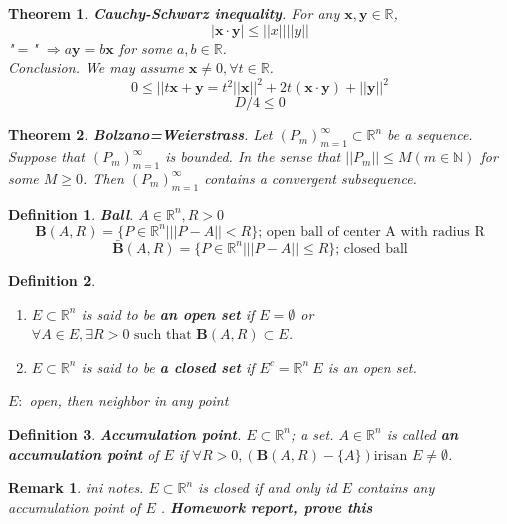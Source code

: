 \documentclass[a4paper,10pt]{article}
\newtheorem{remark}{Remark}[]
\newtheorem{theo}{Theorem}[]
\newtheorem{defi}{Definition}[]
\begin{document}
\begin{theo}
	\textbf{Cauchy-Schwarz inequality}. For any $ \mathbf{x}, \mathbf{y} \in \mathbb{R} $,
	\[ |\mathbf{x} \cdot \mathbf{y}| \leq ||x|| ||y||\]
	"$ = $" $ \Rightarrow  a\mathbf{y} = b\mathbf{x}$ for some $ a,b \in \mathbb{R} $.\\
	Conclusion. We may assume $ \mathbf{x} \neq 0 , \forall t \in \mathbb{R} $.
	\[ 0 \leq ||t\mathbf{x}+\mathbf{y} = t^2||\mathbf{x}||^2+2t(\mathbf{x}\cdot\mathbf{y})+||\mathbf{y}||^2 \]
	\[D/4 \leq 0\]
\end{theo}

\begin{theo}
	\textbf{Bolzano=Weierstrass}. Let $ (P_{m})_{m=1}^{\infty} \subset \mathbb{R}^n $ be a sequence. Suppose that $ (P_{m})_{m=1}^{\infty} $ is bounded. In the sense that $ ||P_{m}|| \leq M (m \in \mathbb{N}) $ for some $ M \geq 0 $. Then $ (P_{m})_{m=1}^{\infty} $ contains a convergent subsequence.
\end{theo}

\begin{defi}
	\textbf{Ball}. $ A \in \mathbb{R}^n, R>0 $
	\[ \mathbf{B}(A,R) = \{ P \in \mathbb{R}^n | ||P-A||<R \} \text{; open ball of center A with radius R} \]
	\[ \bar{\mathbf{B}}(A,R) = \{ P \in \mathbb{R}^n | ||P-A||\leq R \} \text{; closed ball} \]
\end{defi}

\begin{defi}
	\begin{enumerate}
		\item $ E \subset \mathbb{R}^n $ is said to be \textbf{an open set} if $ E = \emptyset $ or $ \forall A \in E , \exists R>0 \text{ such that } \mathbf{B}(A,R) \subset E $.
		\item $ E \subset \mathbb{R}^n $ is said to be \textbf{a closed set} if $ E^{c} = \mathbb{R}^n \ E $ is an open set.
	\end{enumerate}
	$ E : $ open, then neighbor in any point %
\end{defi}

\begin{defi}
	\textbf{Accumulation point}. $ E \subset \mathbb{R}^n $; a set. $ A \in \mathbb{R}^n $ is called \textbf{an accumulation point} of $ E $ if $ \forall R>0, (\mathbf{B}(A,R)-\{A\}) \text{irisan } E \neq \emptyset $.
\end{defi}

\begin{remark}
	ini notes. $ E \subset \mathbb{R}^n $ is closed if and only id $ E $ contains any accumulation point of $ E $ . \textbf{Homework report, prove this}
\end{remark}
\end{document}
